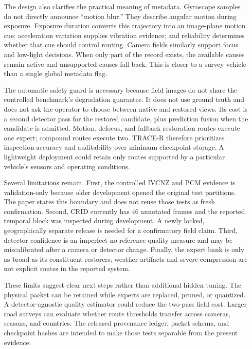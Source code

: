 \documentclass[journal]{IEEEtran}
\begin{document}
The design also clarifies the practical meaning of metadata. Gyroscope samples do not directly announce ``motion blur.'' They describe angular motion during exposure. Exposure duration converts this trajectory into an image-plane motion cue; acceleration variation supplies vibration evidence; and reliability determines whether that cue should control routing. Camera fields similarly support focus and low-light decisions. When only part of the record exists, the available causes remain active and unsupported causes fall back. This is closer to a survey vehicle than a single global metadata flag.

The automatic safety guard is necessary because field images do not share the controlled benchmark's degradation guarantee. It does not use ground truth and does not ask the operator to choose between native and restored views. Its cost is a second detector pass for the restored candidate, plus prediction fusion when the candidate is admitted. Motion, defocus, and fallback restoration routes execute one expert; compound routes execute two. TRACE-R therefore prioritizes inspection accuracy and auditability over minimum checkpoint storage. A lightweight deployment could retain only routes supported by a particular vehicle's sensors and operating conditions.

Several limitations remain. First, the controlled IVCNZ and PCM evidence is validation-only because older development opened the original test partitions. The paper states this boundary and does not reuse those tests as fresh confirmation. Second, CRID currently has 46 annotated frames and the reported temporal block was inspected during development. A newly locked, geographically separate release is needed for a confirmatory field claim. Third, detector confidence is an imperfect no-reference quality measure and may be miscalibrated after a camera or detector change. Finally, the expert bank is only as broad as its constituent restorers; weather artifacts and severe compression are not explicit routes in the reported system.

These limits suggest clear next steps rather than additional hidden tuning. The physical packet can be retained while experts are replaced, pruned, or quantized. A detector-agnostic quality estimator could reduce the two-pass field cost. Larger road surveys can evaluate whether route thresholds transfer across cameras, seasons, and countries. The released provenance ledger, packet schema, and checkpoint hashes are intended to make those tests separable from the present evidence.
\end{document}
